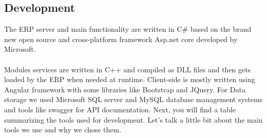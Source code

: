 \subsection{Development}
The ERP server and main functionality are written in C\# based on the brand new open source and cross-platform framework Asp.net core developed by Microsoft.\\\\
Modules services are written in C++ and compiled as DLL files and then gets loaded by the ERP when needed at runtime. Client-side is mostly written using Angular framework with some libraries like Bootstrap and JQuery. For Data storage we used Microsoft SQL server and MySQL database management systems and tools like swagger for API documentation. Next, you will find a table summarizing the tools used for development. Let’s talk a little bit about the main tools we use and why we chose them.
\\
